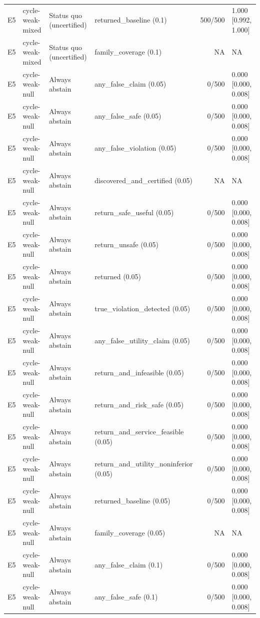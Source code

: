 \begin{longtable}{p{.04\linewidth}p{.18\linewidth}p{.19\linewidth}p{.16\linewidth}r p{.21\linewidth}}
E5 & cycle-weak-mixed & Status quo (uncertified) & returned\_baseline (0.1) & 500/500 & 1.000 [0.992, 1.000]\\
E5 & cycle-weak-mixed & Status quo (uncertified) & family\_coverage (0.1) & NA & NA\\
E5 & cycle-weak-null & Always abstain & any\_false\_claim (0.05) & 0/500 & 0.000 [0.000, 0.008]\\
E5 & cycle-weak-null & Always abstain & any\_false\_safe (0.05) & 0/500 & 0.000 [0.000, 0.008]\\
E5 & cycle-weak-null & Always abstain & any\_false\_violation (0.05) & 0/500 & 0.000 [0.000, 0.008]\\
E5 & cycle-weak-null & Always abstain & discovered\_and\_certified (0.05) & NA & NA\\
E5 & cycle-weak-null & Always abstain & return\_safe\_useful (0.05) & 0/500 & 0.000 [0.000, 0.008]\\
E5 & cycle-weak-null & Always abstain & return\_unsafe (0.05) & 0/500 & 0.000 [0.000, 0.008]\\
E5 & cycle-weak-null & Always abstain & returned (0.05) & 0/500 & 0.000 [0.000, 0.008]\\
E5 & cycle-weak-null & Always abstain & true\_violation\_detected (0.05) & 0/500 & 0.000 [0.000, 0.008]\\
E5 & cycle-weak-null & Always abstain & any\_false\_utility\_claim (0.05) & 0/500 & 0.000 [0.000, 0.008]\\
E5 & cycle-weak-null & Always abstain & return\_and\_infeasible (0.05) & 0/500 & 0.000 [0.000, 0.008]\\
E5 & cycle-weak-null & Always abstain & return\_and\_risk\_safe (0.05) & 0/500 & 0.000 [0.000, 0.008]\\
E5 & cycle-weak-null & Always abstain & return\_and\_service\_feasible (0.05) & 0/500 & 0.000 [0.000, 0.008]\\
E5 & cycle-weak-null & Always abstain & return\_and\_utility\_noninferior (0.05) & 0/500 & 0.000 [0.000, 0.008]\\
E5 & cycle-weak-null & Always abstain & returned\_baseline (0.05) & 0/500 & 0.000 [0.000, 0.008]\\
E5 & cycle-weak-null & Always abstain & family\_coverage (0.05) & NA & NA\\
E5 & cycle-weak-null & Always abstain & any\_false\_claim (0.1) & 0/500 & 0.000 [0.000, 0.008]\\
E5 & cycle-weak-null & Always abstain & any\_false\_safe (0.1) & 0/500 & 0.000 [0.000, 0.008]\\

\end{longtable}
